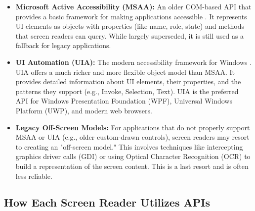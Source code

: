 \begin{itemize}
	\item \textbf{Microsoft Active Accessibility (MSAA):} An older COM-based API that provides a basic framework for making applications accessible \cite{MSAAWiki}. It represents UI elements as objects with properties (like name, role, state) and methods that screen readers can query. While largely superseded, it is still used as a fallback for legacy applications.
	\item \textbf{UI Automation (UIA):} The modern accessibility framework for Windows \cite{UIAutomationOverview}. UIA offers a much richer and more flexible object model than MSAA. It provides detailed information about UI elements, their properties, and the patterns they support (e.g., Invoke, Selection, Text). UIA is the preferred API for Windows Presentation Foundation (WPF), Universal Windows Platform (UWP), and modern web browsers.
	\item \textbf{Legacy Off-Screen Models:} For applications that do not properly support MSAA or UIA (e.g., older custom-drawn controls), screen readers may resort to creating an "off-screen model." This involves techniques like intercepting graphics driver calls (GDI) or using Optical Character Recognition (OCR) to build a representation of the screen content. This is a last resort and is often less reliable.
\end{itemize}

\subsection{How Each Screen Reader Utilizes APIs}
\label{sub:how-each-screen-reader-utilizes-apis}


